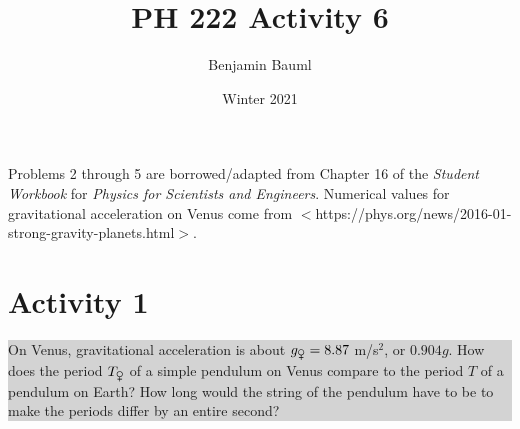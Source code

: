 \documentclass[]{article}
\title{PH 222 Activity 6}
\author{Benjamin Bauml}
\date{Winter 2021}
\newcommand{\excerpt}[1]{\colorbox{lightgray}{\parbox{14.8cm}{#1}} \\}
\begin{document}
\maketitle

\begin{center}
Problems 2 through 5 are borrowed/adapted from Chapter 16 of the \textit{Student Workbook} for \textit{Physics for Scientists and Engineers}. Numerical values for gravitational acceleration on Venus come from $ < $https://phys.org/news/2016-01-strong-gravity-planets.html$ > $.
\end{center}
\section*{Activity 1}
\excerpt{
On Venus, gravitational acceleration is about $ g_{\venus} = 8.87 $ m/s$ ^{2} $, or $ 0.904g $. How does the period $ T_{\venus} $ of a simple pendulum on Venus compare to the period $ T $ of a pendulum on Earth? How long would the string of the pendulum have to be to make the periods differ by an entire second?
}
\end{document}
